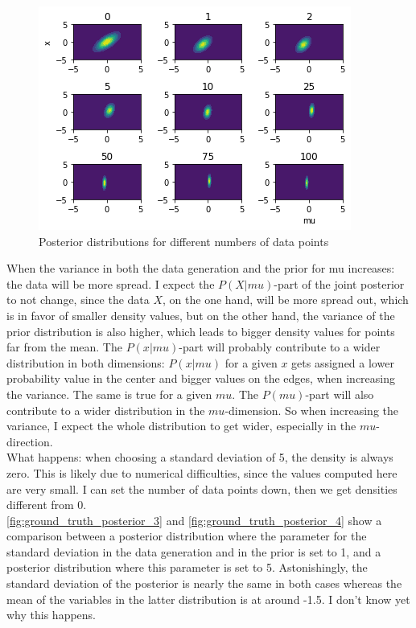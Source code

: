 \documentclass{article}
\begin{document}
\begin{figure}
	\includegraphics[width=\textwidth]{images/posterior_different_data_sizes.png}
	\caption[Posterior distributions for different numbers of data points]{Posterior distributions for different numbers of data points}
	\label{fig:posterior_different_data_sizes}
\end{figure}
When the variance in both the data generation and the prior for mu increases: the data will be more spread. I expect the $P(X|mu)$-part of the joint posterior to not change, since the data $X$, on the one hand, will be more spread out, which is in favor of smaller density values, but on the other hand, the variance of the prior distribution is also higher, which leads to bigger density values for points far from the mean. The $P(x|mu)$-part will probably contribute to a wider distribution in both dimensions: $P(x|mu)$ for a given $x$ gets assigned a lower probability value in the center and bigger values on the edges, when increasing the variance. The same is true for a given $mu$. The $P(mu)$-part will also contribute to a wider distribution in the $mu$-dimension.
So when increasing the variance, I expect the whole distribution to get wider, especially in the $mu$-direction.
\\
What happens: when choosing a standard deviation of 5, the density is always zero. This is likely due to numerical difficulties, since the values computed here are very small.
I can set the number of data points down, then we get densities different from 0.
\\
\autoref{fig:ground_truth_posterior_3} and \autoref{fig:ground_truth_posterior_4} show a comparison between a posterior distribution where the parameter for the standard deviation in the data generation and in the prior is set to 1, and a posterior distribution where this parameter is set to 5. Astonishingly, the standard deviation of the posterior is nearly the same in both cases whereas the mean of the variables in the latter distribution is at around -1.5. I don't know yet why this happens. 
\end{document}
